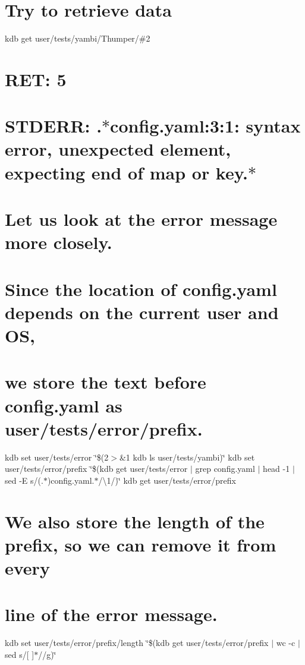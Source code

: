 \section*{Try to retrieve data}

kdb get user/tests/yambi/\+Thumper/\#2 \section*{R\+ET\+: 5}

\section*{S\+T\+D\+E\+RR\+: .$\ast$config.yaml\+:3\+:1\+: syntax error, unexpected element, expecting end of map or key.$\ast$}

\section*{Let us look at the error message more closely.}

\section*{Since the location of {\ttfamily config.\+yaml} depends on the current user and OS,}

\section*{we store the text before {\ttfamily config.\+yaml} as {\ttfamily user/tests/error/prefix}.}

kdb set user/tests/error \char`\"{}\$(2$>$\&1 kdb ls user/tests/yambi)\char`\"{} kdb set user/tests/error/prefix \char`\"{}\$(kdb get user/tests/error $\vert$ grep \textquotesingle{}config.\+yaml\textquotesingle{} $\vert$ head -\/1 $\vert$ sed -\/\+E \textquotesingle{}s/(.$\ast$)config.\+yaml.$\ast$/\textbackslash{}1/\textquotesingle{})\char`\"{} kdb get user/tests/error/prefix \section*{We also store the length of the prefix, so we can remove it from every}

\section*{line of the error message.}

kdb set user/tests/error/prefix/length \char`\"{}\$(kdb get user/tests/error/prefix $\vert$ wc -\/c $\vert$ sed \textquotesingle{}s/\mbox{[} \mbox{]}$\ast$//g\textquotesingle{})\char`\"{}

